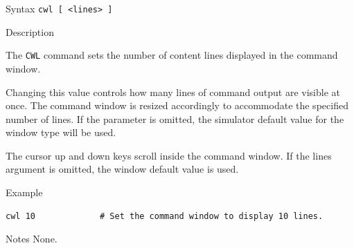 %
%
\pagebreak
{}

\begin{iPageDescEntry}{Syntax}
\texttt{cwl [ <lines> ]} \\
\end{iPageDescEntry}

\begin{iPageDescEntry}{Description}

The \texttt{CWL} command sets the number of content lines displayed in the command
window.

Changing this value controls how many lines of command output are visible at once. The command window is resized accordingly to accommodate the specified number of lines. If the parameter is omitted, the simulator default value for the window type will be used.

The cursor up and down keys scroll inside the command window. If the lines argument is omitted, the window default value is used.

\end{iPageDescEntry}

\begin{iPageDescOpEntry}{Example}
\begin{lstlisting}[style=iPageOpStyle]
cwl 10             # Set the command window to display 10 lines.
\end{lstlisting}
\end{iPageDescOpEntry}

\begin{iPageDescEntry}{Notes}
None.
\end{iPageDescEntry}
